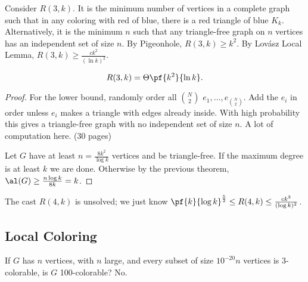 Consider $R(3,k)$. It is the minimum number of vertices in a complete graph such that in any coloring with red of blue, 
there is a red triangle of blue $K_k$. Alternatively, it is the minimum $n$ such that any triangle-free graph on $n$ vertices has an independent set of size $n$. By Pigeonhole, $R(3,k)\ge k^2$. By Lov\'asz Local Lemma, $R(3,k)\ge \frac{ck^2}{(\ln k)^2}$. 
\begin{thm}
\[R(3,k)=\Theta\pf{k^2}{\ln k}.\]
\end{thm}
\begin{proof}
For the lower bound, randomly order all $\binom N2$ $e_1,\ldots, e_{\binom N2}$. Add the $e_i$ in order unless $e_i$ makes a triangle with edges already inside. With high probability this gives a triangle-free graph with no independent set of size $n$. A lot of computation here. (30 pages)

Let $G$ have at least $n=\frac{8k^2}{\log k}$ vertices and be triangle-free. If the maximum degree is at least $k$ we are done. Otherwise by the previous theorem, $\al(G)\ge \frac{n\log k}{8k}=k$.
\end{proof}
The cast $R(4,k)$ is unsolved; we just know $\pf{k}{\log k}^{\frac 52}\le R(4,k)\le \frac{ck^3}{(\log k)^2}$. 

\subsection{Local Coloring}
If $G$ has $n$ vertices, with $n$ large, and every subset of size $10^{-20}n$ vertices is 3-colorable, is $G$ 100-colorable? No.

